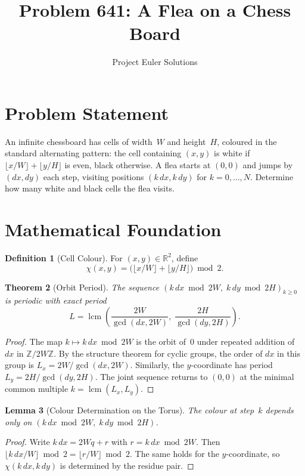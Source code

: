 \documentclass[11pt]{article}
\title{Problem 641: A Flea on a Chess Board}
\author{Project Euler Solutions}
\date{}
\newtheorem{theorem}{Theorem}
\newtheorem{lemma}[theorem]{Lemma}
\theoremstyle{definition}
\newtheorem{definition}[theorem]{Definition}
\begin{document}
\maketitle

\section{Problem Statement}

An infinite chessboard has cells of width~$W$ and height~$H$, coloured in the standard alternating pattern: the cell containing $(x,y)$ is white if $\lfloor x/W\rfloor + \lfloor y/H\rfloor$ is even, black otherwise. A flea starts at $(0,0)$ and jumps by $(dx,dy)$ each step, visiting positions $(k\,dx,k\,dy)$ for $k=0,\ldots,N$. Determine how many white and black cells the flea visits.

\section{Mathematical Foundation}

\begin{definition}[Cell Colour]
For $(x,y)\in\mathbb{R}^2$, define
\[
\chi(x,y) = \bigl(\lfloor x/W\rfloor + \lfloor y/H\rfloor\bigr)\bmod 2.
\]
\end{definition}

\begin{theorem}[Orbit Period]
The sequence $(k\,dx\bmod 2W,\;k\,dy\bmod 2H)_{k\ge 0}$ is periodic with exact period
\[
L = \operatorname{lcm}\!\left(\frac{2W}{\gcd(dx,2W)},\;\frac{2H}{\gcd(dy,2H)}\right).
\]
\end{theorem}

\begin{proof}
The map $k\mapsto k\,dx\bmod 2W$ is the orbit of~$0$ under repeated addition of $dx$ in $\mathbb{Z}/2W\mathbb{Z}$. By the structure theorem for cyclic groups, the order of $dx$ in this group is $L_x = 2W/\gcd(dx,2W)$. Similarly, the $y$-coordinate has period $L_y = 2H/\gcd(dy,2H)$. The joint sequence returns to $(0,0)$ at the minimal common multiple $k = \operatorname{lcm}(L_x,L_y)$.
\end{proof}

\begin{lemma}[Colour Determination on the Torus]
The colour at step~$k$ depends only on $(k\,dx\bmod 2W,\;k\,dy\bmod 2H)$.
\end{lemma}

\begin{proof}
Write $k\,dx = 2Wq + r$ with $r = k\,dx\bmod 2W$. Then $\lfloor k\,dx/W\rfloor\bmod 2 = \lfloor r/W\rfloor\bmod 2$. The same holds for the $y$-coordinate, so $\chi(k\,dx,k\,dy)$ is determined by the residue pair.
\end{proof}
\end{document}
